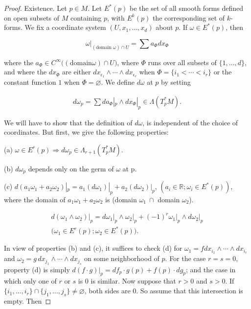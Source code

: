 \begin{proof}
Existence. Let $p \in M$. Let $E^*(p)$ be the set of all smooth forms defined on open subsets of $M$ containing $p$, with $E^k(p)$ the corresponding set of $k$-forms. We fix a coordinate system $(U, x_1, \ldots, x_d)$ about $p$. If $\omega \in E^*(p)$, then


\[
\omega\big|_{(\text{domain }\omega)\cap U}=\sum a_{\Phi}d x_{\Phi}
\]

where the $a_\Phi \in C^\infty\big((\text{domain} \omega) \cap U\big)$, where $\Phi$ runs over all subsets of $\{1, \ldots, d\}$, and where the $dx_\Phi$ are either $dx_{\epsilon_1} \wedge \cdots \wedge dx_{\epsilon_r}$ when $\Phi = \{i_1 < \cdots < i_r\}$ or the constant function $1$ when $\Phi = \varnothing$. We define $d\omega$ at $p$ by setting

\[
\begin{array}{r}{d\omega_{p}=\sum d a_{\Phi}|_{p}\wedge d x_{\Phi}|_{p}\in\Lambda(T_{p}^{*} M).}\end{array}
\]


We will have to show that the definition of  $ d\omega $, is independent of the choice of coordinates. But first, we give the following properties:

(a)  $ \omega \in E^{r}(p) \Rightarrow d\omega_{p} \in \Lambda_{r+1}(T_{p}^{*} M) $.

(b)  $ d\omega_{p} $ depends only on the germ of  $ \omega $ at p.

(c)  $ d(a_1\omega_1 + a_2\omega_2)|_{p} = a_1(d\omega_1)|_{p} + a_2(d\omega_2)|_{p} $,  $ (a_i \in \mathbb{R}; \omega_i \in E^*(p)) $, where the domain of  $ a_1\omega_1 + a_2\omega_2 $ is (domain $ \omega_1\ \cap $ domain $ \omega_2 $).

\[
\begin{array}{r}{d(\omega_{1}\wedge\omega_{2})\big|_{p}=d\omega_{1}\big|_{p}\wedge\omega_{2}\big|_{p}+(-1)^{r}\omega_{1}\big|_{p}\wedge d\omega_{2}\big|_{p}}\\ {\big(\omega_{1}\in E^{r}(p);\omega_{2}\in E^{*}(p)\big).}\end{array}
\]

In view of properties (b) and (c), it suffices to check (d) for $\omega_1 = f dx_{i_1} \wedge \cdots \wedge dx_{i_r}$ and $\omega_2 = g\, dx_{j_1} \wedge \cdots \wedge dx_{j_s}$ on some neighborhood of $p$. For the case $r = s = 0$, property (d) is simply $d(f \cdot g)|_{p} = df_p \cdot g(p) + f(p) \cdot dg_p$; and the case in which only one of $r$ or $s$ is $0$ is similar. Now suppose that $r > 0$ and $s > 0$. If $\{i_1, \ldots, i_r\} \cap \{j_1, \ldots, j_s\} \neq \varnothing$, both sides are 0. So assume that this intersection is empty. Then


\end{proof}

